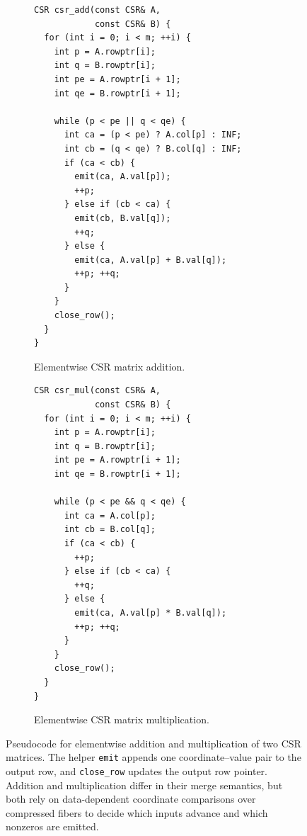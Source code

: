 
\begin{figure}[]
    \centering

    \begin{subfigure}[t]{0.48\linewidth}
        \centering
\begin{lstlisting}[numbers=none,xleftmargin=0em]
CSR csr_add(const CSR& A,
            const CSR& B) {
  for (int i = 0; i < m; ++i) {
    int p = A.rowptr[i];
    int q = B.rowptr[i];
    int pe = A.rowptr[i + 1];
    int qe = B.rowptr[i + 1];

    while (p < pe || q < qe) {
      int ca = (p < pe) ? A.col[p] : INF;
      int cb = (q < qe) ? B.col[q] : INF;
      if (ca < cb) {
        emit(ca, A.val[p]);
        ++p;
      } else if (cb < ca) {
        emit(cb, B.val[q]);
        ++q;
      } else {
        emit(ca, A.val[p] + B.val[q]);
        ++p; ++q;
      }
    }
    close_row();
  }
}
\end{lstlisting}
        \caption{Elementwise CSR matrix addition.}
        \label{fig:background-csr-spadd-pseudocode}
    \end{subfigure}
    \hfill
    \begin{subfigure}[t]{0.48\linewidth}
        \centering
\begin{lstlisting}[numbers=none,xleftmargin=0em]
CSR csr_mul(const CSR& A,
            const CSR& B) {
  for (int i = 0; i < m; ++i) {
    int p = A.rowptr[i];
    int q = B.rowptr[i];
    int pe = A.rowptr[i + 1];
    int qe = B.rowptr[i + 1];

    while (p < pe && q < qe) {
      int ca = A.col[p];
      int cb = B.col[q];
      if (ca < cb) {
        ++p;
      } else if (cb < ca) {
        ++q;
      } else {
        emit(ca, A.val[p] * B.val[q]);
        ++p; ++q;
      }
    }
    close_row();
  }
}
\end{lstlisting}
        \caption{Elementwise CSR matrix multiplication.}
        \label{fig:background-csr-spmul-pseudocode}
    \end{subfigure}

    \caption[CSR elementwise addition and multiplication.]{Pseudocode for elementwise addition and multiplication of two CSR matrices. The helper \texttt{emit} appends one coordinate--value pair to the output row, and \texttt{close\_row} updates the output row pointer. Addition and multiplication differ in their merge semantics, but both rely on data-dependent coordinate comparisons over compressed fibers to decide which inputs advance and which nonzeros are emitted.}
    \label{fig:background-csr-elementwise-pseudocode}
\end{figure}
